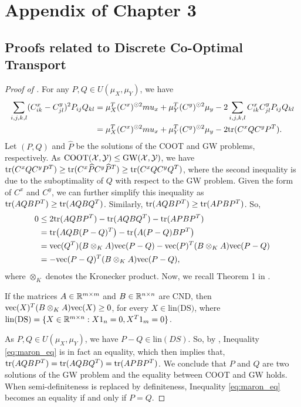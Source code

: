 \section{Appendix of Chapter 3}

\subsection{Proofs related to Discrete Co-Optimal Transport}

\begin{proof}[Proof of ]
  For any $P, Q \in U(\mu_X, \mu_Y)$, we have
  \begin{align}
    \sum_{i,j,k,l} (C^x_{ik} - C^y_{jl})^2 P_{ij} Q_{kl} &=
    \mu_X^T (C^x)^{\odot 2} mu_x + \mu_Y^T (C^y)^{\odot 2}\mu_y
      - 2 \sum_{i,j,k,l} C^x_{ik} C^y_{jl} P_{ij} Q_{kl} \\
    &= \mu_X^T (C^x)^{\odot 2} mu_x + \mu_Y^T (C^y)^{\odot 2}\mu_y - 2 \text{tr}(C^x Q C^y P^T).
  \end{align}
  Let $(P, Q)$ and $\widehat{P}$ be the solutions of the COOT and GW problems, respectively.
  As $\text{COOT}(\mathcal X, \mathcal Y) \leq \text{GW}(\mathcal X, \mathcal Y)$, we have
  $\text{tr}(C^x Q C^y P^T) \geq \text{tr}(C^x \widehat{P} C^y \widehat{P}^T) \geq \text{tr}(C^x Q C^y Q^T)$,
  where the second inequality is due to the suboptimality of $Q$ with respect to the GW problem.
  Given the form of $C^x$ and $C^y$, we can further simplify this inequality as
  $\text{tr}(A Q B P^T) \geq \text{tr}(A Q B Q^T)$. Similarly, $\text{tr}(A Q B P^T) \geq \text{tr}(A P B P^T)$. So,
  \begin{align} \label{eq:maron_eq}
    0 &\leq 2 \text{tr}(AQBP^T) - \text{tr}(AQBQ^T) - \text{tr}(APBP^T) \\
    &= \text{tr} \big( AQB (P-Q)^T \big) - \text{tr}\big( A(P-Q) B P^T \big) \\
    &= \text{vec}(Q^T) (B \otimes_K A) \text{vec}(P-Q) - \text{vec}(P)^T (B \otimes_K A) \text{vec}(P-Q) \\
    &= - \text{vec}(P-Q)^T (B \otimes_K A) \text{vec}(P-Q),
  \end{align}
  where $\otimes_K$ denotes the Kronecker product. Now, we recall Theorem 1 in \citep{Maron18}.
  \begin{lemma} \label{lemma:maron}
    If the matrices $A \in \mathbb R^{m \times m}$ and $B \in \mathbb R^{n \times n}$
    are CND, then $\text{vec}(X)^T (B \otimes_K A) \text{vec}(X) \geq 0$, for every $X \in \text{lin(DS)}$,
    where $\text{lin(DS)} = \{X \in \mathbb R^{m \times n}: X 1_n = 0, X^T 1_m = 0 \}$.
  \end{lemma}
  As $P, Q \in U(\mu_X, \mu_Y)$, we have $P-Q \in \text{lin}(DS)$. So, by ,
  Inequality \eqref{eq:maron_eq} is in fact an equality, which then implies that,
  $\text{tr}(A Q B P^T) = \text{tr}(A Q B Q^T) = \text{tr}(A P B P^T)$.
  We conclude that $P$ and $Q$ are two solutions of the GW problem and
  the equality between COOT and GW holds. When semi-definiteness is replaced by definiteness,
  Inequality \eqref{eq:maron_eq} becomes an equality if and only if $P=Q$.
\end{proof}

